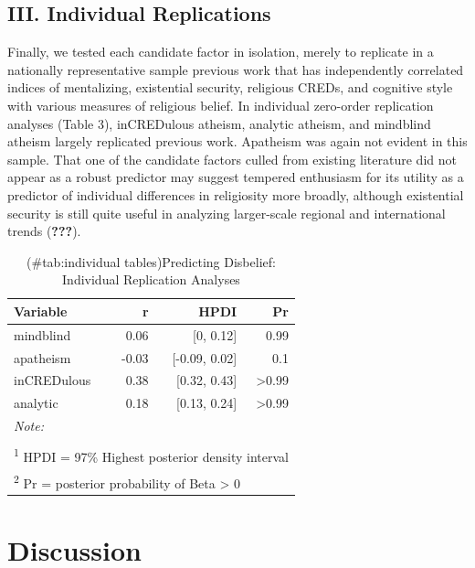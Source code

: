 \documentclass[english,man,mask]{article}
\begin{document}
\hypertarget{iii.-individual-replications}{%
\subsection{III. Individual Replications}\label{iii.-individual-replications}}

Finally, we tested each candidate factor in isolation, merely to replicate in a nationally representative sample previous work that has independently correlated indices of mentalizing, existential security, religious CREDs, and cognitive style with various measures of religious belief. In individual zero-order replication analyses (Table 3), inCREDulous atheism, analytic atheism, and mindblind atheism largely replicated previous work. Apatheism was again not evident in this sample. That one of the candidate factors culled from existing literature did not appear as a robust predictor may suggest tempered enthusiasm for its utility as a predictor of individual differences in religiosity more broadly, although existential security is still quite useful in analyzing larger-scale regional and international trends ({\textbf{???}}).

\begin{table}[!h]

\caption{(\#tab:individual tables)Predicting Disbelief: Individual Replication Analyses}
\centering
\begin{tabular}[t]{lrrr}
\toprule
Variable & r & HPDI & Pr\\
\midrule
mindblind & 0.06 & [0, 0.12] & 0.99\\
apatheism & -0.03 & [-0.09, 0.02] & 0.1\\
inCREDulous & 0.38 & [0.32, 0.43] & >0.99\\
analytic & 0.18 & [0.13, 0.24] & >0.99\\
\bottomrule
\multicolumn{4}{l}{\textit{Note: }}\\
\multicolumn{4}{l}{ }\\
\multicolumn{4}{l}{\textsuperscript{1} HPDI = 97\% Highest posterior density interval}\\
\multicolumn{4}{l}{\textsuperscript{2} Pr = posterior probability of Beta > 0}\\
\end{tabular}
\end{table}

\hypertarget{discussion}{%
\section{Discussion}\label{discussion}}
\end{document}
